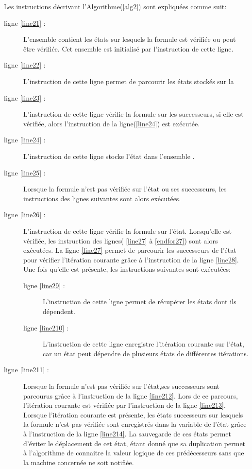 Les instructions décrivant l'Algorithme(\ref{alg2}) sont expliquées comme suit:
\begin{description}
	\item[ligne \ref{line21} :] L'ensemble  contient les états sur lesquels la formule est vérifiée ou peut être vérifiée. Cet ensemble est initialisé par l'instruction de cette ligne.
	\item[ligne \ref{line22} :] L'instruction de cette ligne permet de parcourir les états stockés sur la \mi{}
	\item[ligne \ref{line23} :] L'instruction de cette ligne vérifie la formule sur les successeurs, si elle est vérifiée, alors l'instruction de la ligne(\ref{line24}) est exécutée. 
	\item[ligne \ref{line24} :] L'instruction de cette ligne stocke l'état dans l'ensemble .
	\item[ligne \ref{line25} :] Lorsque la formule n'est pas vérifiée sur l'état ou ses successeurs, les instructions  des lignes suivantes sont alors exécutées. 
	\item[ligne \ref{line26} :] L'instruction de cette ligne vérifie la formule sur l'état. Lorsqu'elle est vérifiée, les instruction des lignes( \ref{line27} à \ref{endfor27}) sont alors exécutées. La ligne \ref{line27} permet de parcourir les successeurs de l'état pour vérifier  l'itération courante grâce à l'instruction de la ligne \ref{line28}. Une fois qu'elle est présente, les instructions suivantes sont exécutées:
	\begin{description}
	\item[ligne \ref{line29} :] L'instruction de cette ligne permet de récupérer les états dont ils dépendent. 
	\item[ligne \ref{line210} :] L'instruction de cette ligne enregistre l'itération courante sur l'état, car un état peut dépendre de plusieurs états de différentes itérations. 
	\end{description}
	\item[ligne \ref{line211} :] Lorsque la formule n'est pas vérifiée sur l'état,ses successeurs sont parcourus grâce à l'instruction de la ligne \ref{line212}. Lors de ce parcours, l'itération courante est vérifiée par l'instruction de la ligne \ref{line213}.\\ Lorsque l'itération courante est présente, les états successeurs sur lesquels la formule n'est pas vérifiée sont enregistrés dans la variable  de l'état grâce à l'instruction de la ligne \ref{line214}. La sauvegarde de ces états permet d'éviter le déplacement de cet état, étant donné que sa duplication permet à l'algorithme de connaitre la valeur logique de ces prédécesseurs sans que la machine concernée ne soit notifiée.
	
\end{description}

